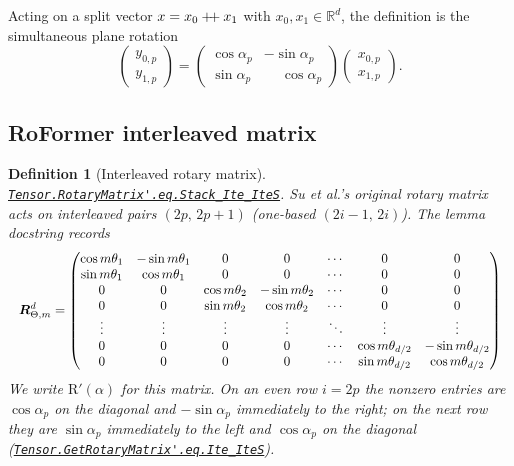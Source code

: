 \documentclass[11pt,a4paper]{article}
\newcommand{\lmod}[1]{\href{http://www.lemma.cn/lean/?module=#1}{\nolinkurl{#1}}}
\newtheorem{definition}[theorem]{Definition}
\newcommand{\R}{\mathbb{R}}
\newcommand{\rot}{\mathrm{R}}
\newcommand{\concat}{\mathbin{+\mkern-4mu+}}
\begin{document}
Acting on a split vector \(x=x_0\concat x_1\) with \(x_0,x_1\in\R^d\), the definition is the simultaneous plane rotation
\begin{equation}
  \label{eq:plane}
  \begin{pmatrix} y_{0,p} \\ y_{1,p} \end{pmatrix}
  =
  \begin{pmatrix}
    \cos\alpha_p & -\sin\alpha_p \\
    \sin\alpha_p & \phantom{-}\cos\alpha_p
  \end{pmatrix}
  \begin{pmatrix} x_{0,p} \\ x_{1,p} \end{pmatrix}.
\end{equation}

\subsection{RoFormer interleaved matrix}
\label{sec:def-su}

\begin{definition}[Interleaved rotary matrix]
\label{def:rotp}
\lmod{Tensor.RotaryMatrix'.eq.Stack_Ite_IteS}.
Su et al.'s original rotary matrix~\cite{su2021roformer} acts on interleaved pairs \((2p,\,2p+1)\) (one-based \((2i-1,\,2i)\)).
The lemma docstring records
\begin{equation}
\label{eq:rot-su}
\resizebox{\linewidth}{!}{\(\displaystyle
{\boldsymbol{R}}^{d}_{\Theta,m}=\begin{pmatrix}
\cos m\theta_{1} & -\sin m\theta_{1} & 0 & 0 & \cdots & 0 & 0 \\
\sin m\theta_{1} & \cos m\theta_{1} & 0 & 0 & \cdots & 0 & 0 \\
0 & 0 & \cos m\theta_{2} & -\sin m\theta_{2} & \cdots & 0 & 0 \\
0 & 0 & \sin m\theta_{2} & \cos m\theta_{2} & \cdots & 0 & 0 \\
\vdots & \vdots & \vdots & \vdots & \ddots & \vdots & \vdots \\
0 & 0 & 0 & 0 & \cdots & \cos m\theta_{d/2} & -\sin m\theta_{d/2} \\
0 & 0 & 0 & 0 & \cdots & \sin m\theta_{d/2} & \cos m\theta_{d/2}
\end{pmatrix}
\)}
\end{equation}
We write \(\rot'(\alpha)\) for this matrix.
On an even row \(i=2p\) the nonzero entries are \(\cos\alpha_p\) on the diagonal and \(-\sin\alpha_p\) immediately to the right; on the next row they are \(\sin\alpha_p\) immediately to the left and \(\cos\alpha_p\) on the diagonal
(\lmod{Tensor.GetRotaryMatrix'.eq.Ite_IteS}).
\end{definition}
\end{document}
